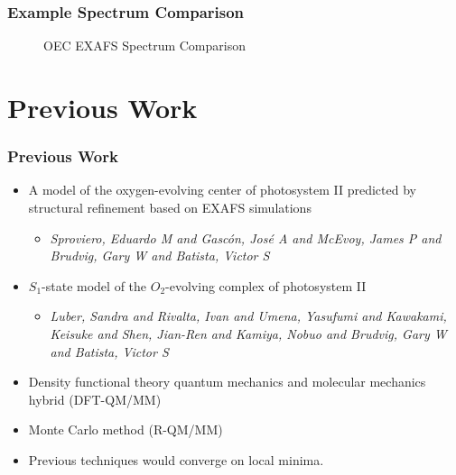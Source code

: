 \documentclass[10pt]{beamer}
\begin{document}
\begin{frame}
	\frametitle{Example Spectrum Comparison}

	\begin{figure}
		\caption{OEC EXAFS Spectrum Comparison}
	\end{figure}

\end{frame}

\section{Previous Work}

\begin{frame}
	\frametitle{Previous Work}

	\begin{itemize}
		\item A model of the oxygen-evolving center of photosystem II predicted by structural refinement based on EXAFS simulations
			\begin{itemize}
				\item \textit{Sproviero, Eduardo M and Gasc{\'o}n, Jos{\'e} A and McEvoy, James P and Brudvig, Gary W and Batista, Victor S}
			\end{itemize}
		\item $S_{1}$-state model of the $O_{2}$-evolving complex of photosystem II
			\begin{itemize}
				\item \textit{Luber, Sandra and Rivalta, Ivan and Umena, Yasufumi and Kawakami, Keisuke and Shen, Jian-Ren and Kamiya, Nobuo and Brudvig, Gary W and Batista, Victor S}
			\end{itemize}
		\item Density functional theory quantum mechanics and molecular mechanics hybrid (DFT-QM/MM)
		\item Monte Carlo method (R-QM/MM)
		\item Previous techniques would converge on local minima.
	\end{itemize}

\end{frame}
\end{document}
